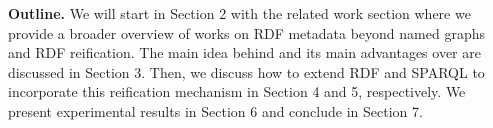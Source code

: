 \textbf{Outline.} We will start in Section 2 with the related work section where we provide a broader overview of works on RDF metadata beyond named graphs and RDF reification. The main idea behind {\ReifiPlus} and its main advantages over {\Reifi} are discussed in Section 3. Then, we discuss how to extend RDF and SPARQL to incorporate this reification mechanism in Section 4 and 5, respectively. We present experimental results in Section 6 and conclude in Section 7. 